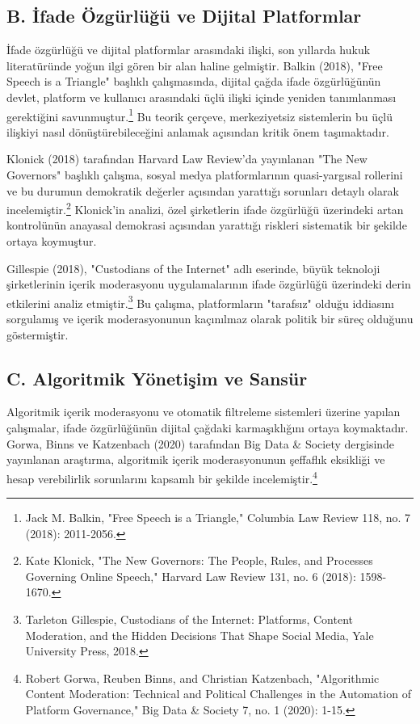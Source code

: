 \documentclass[11pt,a4paper]{article}
\begin{document}
\subsection*{\fontsize{12}{14}\selectfont\bfseries B. İfade Özgürlüğü ve Dijital Platformlar}

İfade özgürlüğü ve dijital platformlar arasındaki ilişki, son yıllarda hukuk literatüründe yoğun ilgi gören bir alan haline gelmiştir. Balkin (2018), "Free Speech is a Triangle" başlıklı çalışmasında, dijital çağda ifade özgürlüğünün devlet, platform ve kullanıcı arasındaki üçlü ilişki içinde yeniden tanımlanması gerektiğini savunmuştur.\footnote{Jack M. Balkin, "Free Speech is a Triangle," Columbia Law Review 118, no. 7 (2018): 2011-2056.} Bu teorik çerçeve, merkeziyetsiz sistemlerin bu üçlü ilişkiyi nasıl dönüştürebileceğini anlamak açısından kritik önem taşımaktadır.

Klonick (2018) tarafından Harvard Law Review'da yayınlanan "The New Governors" başlıklı çalışma, sosyal medya platformlarının quasi-yargısal rollerini ve bu durumun demokratik değerler açısından yarattığı sorunları detaylı olarak incelemiştir.\footnote{Kate Klonick, "The New Governors: The People, Rules, and Processes Governing Online Speech," Harvard Law Review 131, no. 6 (2018): 1598-1670.} Klonick'in analizi, özel şirketlerin ifade özgürlüğü üzerindeki artan kontrolünün anayasal demokrasi açısından yarattığı riskleri sistematik bir şekilde ortaya koymuştur.

Gillespie (2018), "Custodians of the Internet" adlı eserinde, büyük teknoloji şirketlerinin içerik moderasyonu uygulamalarının ifade özgürlüğü üzerindeki derin etkilerini analiz etmiştir.\footnote{Tarleton Gillespie, Custodians of the Internet: Platforms, Content Moderation, and the Hidden Decisions That Shape Social Media, Yale University Press, 2018.} Bu çalışma, platformların "tarafsız" olduğu iddiasını sorgulamış ve içerik moderasyonunun kaçınılmaz olarak politik bir süreç olduğunu göstermiştir.

\subsection*{\fontsize{12}{14}\selectfont\bfseries C. Algoritmik Yönetişim ve Sansür}

Algoritmik içerik moderasyonu ve otomatik filtreleme sistemleri üzerine yapılan çalışmalar, ifade özgürlüğünün dijital çağdaki karmaşıklığını ortaya koymaktadır. Gorwa, Binns ve Katzenbach (2020) tarafından Big Data & Society dergisinde yayınlanan araştırma, algoritmik içerik moderasyonunun şeffaflık eksikliği ve hesap verebilirlik sorunlarını kapsamlı bir şekilde incelemiştir.\footnote{Robert Gorwa, Reuben Binns, and Christian Katzenbach, "Algorithmic Content Moderation: Technical and Political Challenges in the Automation of Platform Governance," Big Data & Society 7, no. 1 (2020): 1-15.}
\end{document}
